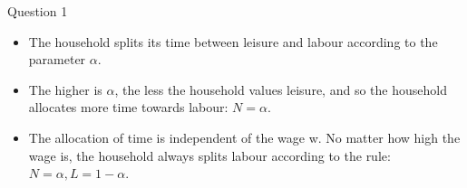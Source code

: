 \documentclass[a4paper]{article}
\newif\IfInSansMode
\begin{document}
\begin{questionbox}{Question 1}
\begin{enumerate}[(a)]
			\begin{explanationbox}
				\begin{itemize}
					\item The household splits its time between leisure and labour according to the parameter \( \alpha \).
					\item The higher is \( \alpha \), the less the household values leisure, and so the household allocates more time towards labour: \( N = \alpha \).
					\item The allocation of time is independent of the wage w. No matter how high the wage is, the household always splits labour according to the rule: \( N = \alpha, L = 1-\alpha \).
				\end{itemize}
			\end{explanationbox}
		\end{enumerate}
	\end{questionbox}
\end{document}
